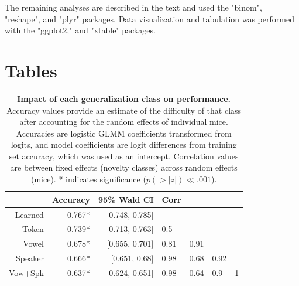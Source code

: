 The remaining analyses are described in the text and used the "binom"\citep{Sundar2014}, "reshape"\citep{Wickham2007}, and "plyr"\citep{Wickham2011} packages. Data visualization and tabulation was performed with the "ggplot2,"\citep{Wickham2009} and "xtable"\citep{Dahl2016} packages.



%


\section{Tables}

\begin{table}
\caption{\textbf{Impact of each generalization class on performance.} Accuracy values provide an estimate of the difficulty of that class after accounting for the random effects of individual mice. Accuracies are logistic GLMM coefficients transformed from logits, and model coefficients are logit differences from training set accuracy, which was used as an intercept. Correlation values are between fixed effects (novelty classes) across random effects (mice). * indicates significance ($p(>|z|)\ll.001$).}
\label{lmmtab}
\begin{tabularx}{\linewidth}{rrr|llll}
  \hline
 & Accuracy & 95\% Wald CI & Corr &  &  &  \\ 
  \hline
Learned & 0.767* & [0.748, 0.785] &  &  &  &  \\ 
  Token & 0.739* & [0.713, 0.763] & 0.5 &  &  &  \\ 
  Vowel & 0.678* & [0.655, 0.701] & 0.81 & 0.91 &  &  \\ 
  Speaker & 0.666* & [0.651, 0.68] & 0.98 & 0.68 & 0.92 &  \\ 
  Vow+Spk & 0.637* & [0.624, 0.651] & 0.98 & 0.64 & 0.9 & 1 \\ 
   \hline
\end{tabularx}

\end{table}

\vspace{1in}

